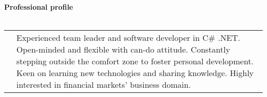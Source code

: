 \textbf{Professional profile}
\\
\\
\begin{tabular}{p{}|p{}}
&Experienced team leader and software developer in C\# .NET. Open-minded and flexible with can-do attitude. Constantly stepping outside the comfort zone to foster personal development. Keen on learning new technologies and sharing
knowledge. Highly interested in financial markets' business domain.\\
\end{tabular}